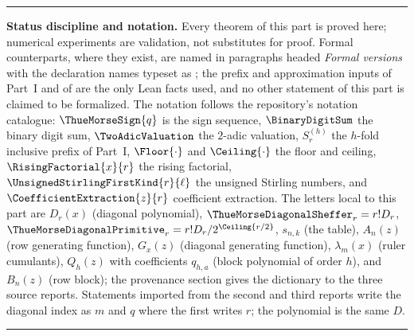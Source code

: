 \documentclass[11pt,oneside]{article}
\numberwithin{equation}{section}
\theoremstyle{definition}
\theoremstyle{remark}
\newenvironment{boxedremark}{%
  \par\smallskip\noindent\begin{center}\begin{minipage}{0.94\textwidth}%
  \color{black}\hrule\vspace{0.6em}\small
}{%
  \vspace{0.6em}\hrule\end{minipage}\end{center}\smallskip
}
\begin{document}
\begin{abstract}
For each fixed row the entire sequence is a signed repetition of one
nonnegative block of length $2^{2n+1}$; the part proves its support,
circular reflection, complement law, exact central plateau, maximum, mass,
moments, multiplicities and number of distinct values, and the finite-block
theorem for every order of iterated summation from which these follow.  The
block coefficients are the level-$2n$ Rvachev histogram of the corpus, the
same finite polynomials $p_{k-1}$ whose corrected samples the Lean
development proves to converge to $\RvachevUp$ and $\FabiusBounded$, and
this part records the exact crosswalk.  Exact algorithms are given for every
regime: symbolic generation of any diagonal, direct evaluation near the
edge, signed-block reduction, and a logarithmic-time evaluator through
signed Thue--Morse prefix moments.  The three exact verification programs
and Wolfram Language implementations shipped with the sources are retained
under .
\end{abstract}

\begin{boxedremark}
\textbf{Status discipline and notation.}
Every theorem of this part is proved here; numerical experiments are
validation, not substitutes for proof.  Formal counterparts, where they
exist, are named in paragraphs headed \emph{Formal versions} with the
declaration names typeset as ; the prefix
and approximation inputs of Part~I and of
 are the only Lean facts used, and no
other statement of this part is claimed to be formalized.  The notation
follows the repository's notation catalogue: $\ThueMorseSign{q}$ is the
sign sequence, $\BinaryDigitSum$ the binary digit sum,
$\TwoAdicValuation$ the $2$-adic valuation, $S^{(h)}_r$ the $h$-fold
inclusive prefix of Part~I, $\Floor{\cdot}$ and $\Ceiling{\cdot}$ the
floor and ceiling, $\RisingFactorial{x}{r}$ the rising factorial,
$\UnsignedStirlingFirstKind{r}{\ell}$ the unsigned Stirling numbers, and
$\CoefficientExtraction{z}{r}$ coefficient extraction.  The letters local to
this part are $D_r(x)$ (diagonal polynomial), $\ThueMorseDiagonalSheffer_r=r!D_r$,
$\ThueMorseDiagonalPrimitive_r=r!D_r/2^{\Ceiling{r/2}}$, $s_{n,k}$ (the
table), $A_n(z)$ (row generating function), $G_x(z)$ (diagonal generating
function), $\lambda_m(x)$ (ruler cumulants), $Q_h(z)$ with coefficients
$q_{h,a}$ (block polynomial of order $h$), and $B_n(z)$ (row block); the
provenance section gives the dictionary to the three source reports.
Statements imported from the second and third reports write the diagonal
index as $m$ and $q$ where the first writes $r$; the polynomial is the same
$D$.
\end{boxedremark}
\end{document}
